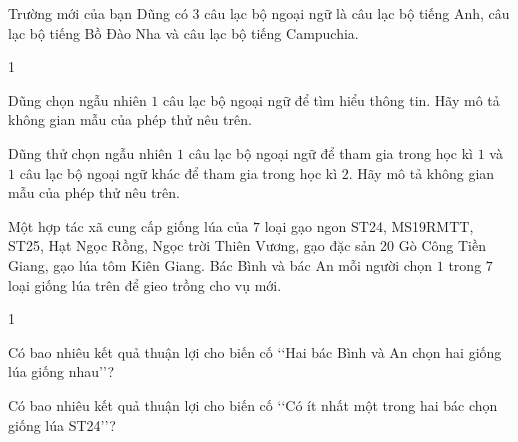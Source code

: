 \begin{baitap}%
	Trường mới của bạn Dũng có $3$ câu lạc bộ ngoại ngữ là câu lạc bộ tiếng Anh, câu lạc bộ tiếng Bồ Đào Nha và câu lạc bộ tiếng Campuchia.
	\begin{enumEX}[a)]{1}
		\item Dũng chọn ngẫu nhiên $1$ câu lạc bộ ngoại ngữ để tìm hiểu thông tin. Hãy mô tả không gian mẫu của phép thử nêu trên.
		\item Dũng thử chọn ngẫu nhiên $1$ câu lạc bộ ngoại ngữ để tham gia trong học kì $1$ và $1$ câu lạc bộ ngoại ngữ khác để tham gia trong học kì $2$. Hãy mô tả không gian mẫu của phép thử nêu trên.
	\end{enumEX}
\end{baitap}

\begin{baitap}%
	Một hợp tác xã cung cấp giống lúa của $7$ loại gạo ngon ST24, MS19RMTT, ST25, Hạt Ngọc Rồng, Ngọc trời Thiên Vương, gạo đặc sản 20 Gò Công Tiền Giang, gạo lúa tôm Kiên Giang. Bác Bình và bác An mỗi người chọn $1$ trong $7$ loại giống lúa trên để gieo trồng cho vụ mới.
	\begin{enumEX}[a)]{1}
		\item Có bao nhiêu kết quả thuận lợi cho biến cố \lq\lq Hai bác Bình và An chọn hai giống lúa giống nhau\rq\rq?
		\item Có bao nhiêu kết quả thuận lợi cho biến cố \lq\lq Có ít nhất một trong hai bác chọn giống lúa ST24\rq\rq?
	\end{enumEX}
\end{baitap}
